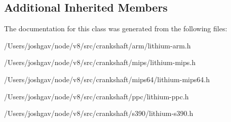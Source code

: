 \subsection*{Additional Inherited Members}


The documentation for this class was generated from the following files\+:\begin{DoxyCompactItemize}
\item 
/\+Users/joshgav/node/v8/src/crankshaft/arm/lithium-\/arm.\+h\item 
/\+Users/joshgav/node/v8/src/crankshaft/mips/lithium-\/mips.\+h\item 
/\+Users/joshgav/node/v8/src/crankshaft/mips64/lithium-\/mips64.\+h\item 
/\+Users/joshgav/node/v8/src/crankshaft/ppc/lithium-\/ppc.\+h\item 
/\+Users/joshgav/node/v8/src/crankshaft/s390/lithium-\/s390.\+h\end{DoxyCompactItemize}
